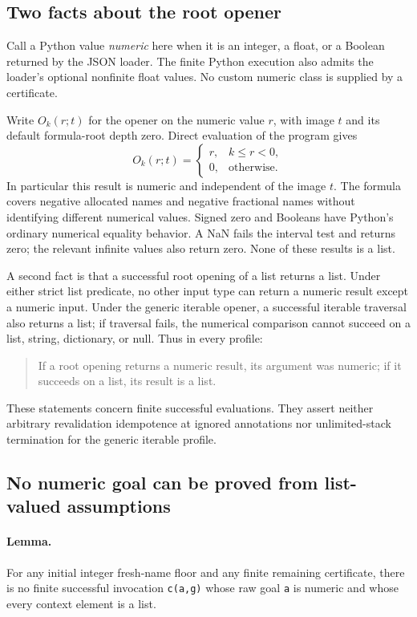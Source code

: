 \subsection{Two facts about the root opener}

Call a Python value \emph{numeric} here when it is an integer, a float,
or a Boolean returned by the JSON loader.  The finite Python execution
also admits the loader's optional nonfinite float values.  No custom
numeric class is supplied by a certificate.

Write $O_k(r;t)$ for the opener on the numeric value $r$, with image $t$
and its default formula-root depth zero.  Direct evaluation of the
program gives
\[
 O_k(r;t)=
 \begin{cases}
 r,&k\le r<0,\\
 0,&\text{otherwise}.
 \end{cases}
 \tag{Root scalar}
\]
In particular this result is numeric and independent of the image $t$.
The formula covers negative allocated names and negative fractional
names without identifying different numerical values.  Signed zero and
Booleans have Python's ordinary numerical equality behavior.  A NaN
fails the interval test and returns zero; the relevant infinite values
also return zero.  None of these results is a list.

A second fact is that a successful root opening of a list returns a
list.  Under either strict list predicate, no other input type can
return a numeric result except a numeric input.  Under the generic
iterable opener, a successful iterable traversal also returns a list;
if traversal fails, the numerical comparison cannot succeed on a list,
string, dictionary, or null.  Thus in every profile:
\begin{quote}
If a root opening returns a numeric result, its argument was numeric;
if it succeeds on a list, its result is a list.
\end{quote}
These statements concern finite successful evaluations.  They assert
neither arbitrary revalidation idempotence at ignored annotations nor
unlimited-stack termination for the generic iterable profile.

\subsection{No numeric goal can be proved from list-valued assumptions}

\paragraph{Lemma.}
For any initial integer fresh-name floor and any finite remaining
certificate, there is no finite successful invocation
\texttt{c(a,g)} whose raw goal \texttt{a} is numeric and whose every
context element is a list.

